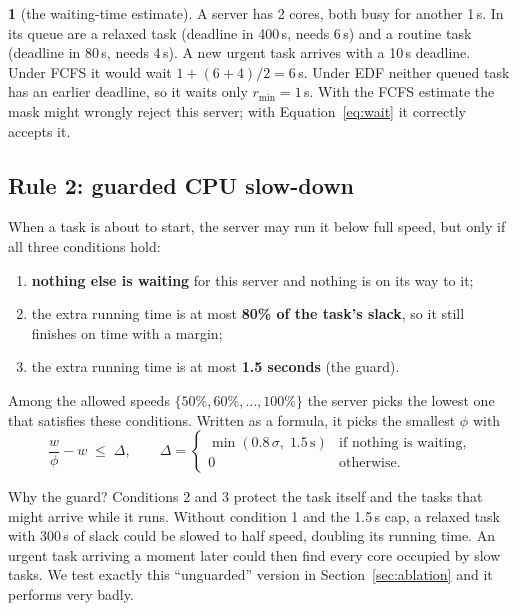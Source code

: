 \documentclass[11pt]{article}
\theoremstyle{definition}
\newcommand{\textblockname}{}
\newtheorem*{textblock*}{\textblockname}
\newenvironment{workedexample}[1]{%
  \renewcommand{\textblockname}{Worked example #1}%
  \def\FrameCommand{{\color{accent}\vrule width 2.25pt}\hspace{8pt}}%
  \MakeFramed{\advance\hsize-10.25pt\FrameRestore}%
  \begin{textblock*}}{\end{textblock*}%
  \endMakeFramed}
\begin{document}
\begin{workedexample}{3}[the waiting-time estimate]
A server has 2 cores, both busy for another 1\,s. In its queue are a relaxed task (deadline in 400\,s, needs
6\,s) and a routine task (deadline in 80\,s, needs 4\,s). A new urgent task arrives with a 10\,s deadline.
Under FCFS it would wait $1 + (6+4)/2 = 6$\,s. Under EDF neither queued task has an earlier deadline, so it waits
only $r_{\min} = 1$\,s. With the FCFS estimate the mask might wrongly reject this server; with
Equation~\ref{eq:wait} it correctly accepts it.
\end{workedexample}

\subsection{Rule 2: guarded CPU slow-down}
\label{sec:rule2}
When a task is about to start, the server may run it below full speed, but only if all three conditions hold:
\begin{enumerate}
\item \textbf{nothing else is waiting} for this server and nothing is on its way to it;
\item the extra running time is at most \textbf{80\% of the task's slack}, so it still finishes on time with a
margin;
\item the extra running time is at most \textbf{1.5 seconds} (the guard).
\end{enumerate}
Among the allowed speeds $\{50\%, 60\%, \dots, 100\%\}$ the server picks the lowest one that satisfies these
conditions. Written as a formula, it picks the smallest $\phi$ with
\begin{equation}
\frac{w}{\phi} - w \;\le\; \Delta, \qquad
\Delta = \begin{cases}\min(0.8\,\sigma,\; 1.5\,\text{s}) & \text{if nothing is waiting,}\\
0 & \text{otherwise.}\end{cases}
\label{eq:dvfs}
\end{equation}

Why the guard? Conditions 2 and 3 protect the task itself and the tasks that might arrive while it runs. Without
condition 1 and the 1.5\,s cap, a relaxed task with 300\,s of slack could be slowed to half speed, doubling its
running time. An urgent task arriving a moment later could then find every core occupied by slow tasks. We test
exactly this ``unguarded'' version in Section~\ref{sec:ablation} and it performs very badly.
\end{document}
